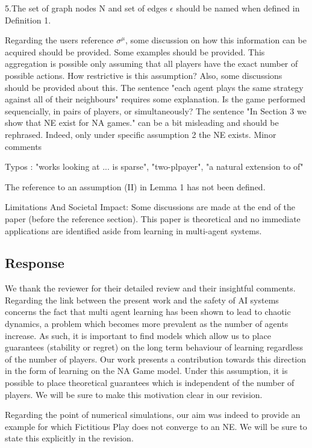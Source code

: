 \documentclass{article}
\begin{document}
	5.The set of graph nodes N and set of edges $\epsilon$ should be named when defined in Definition 1.
	
	Regarding the users reference $\sigma^{\mu}$, some discussion on how this information can be acquired should be provided. Some examples should be provided. This aggregation is possible only assuming that all players have the exact number of possible actions. How restrictive is this assumption? Also, some discussions should be provided about this.
	The sentence "each agent plays the same strategy against all of their neighbours" requires some explanation. Is the game performed sequencially, in pairs of players, or simultaneously?
	The sentence "In Section 3 we show that NE exist for NA games." can be a bit misleading and should be rephrased. Indeed, only under specific assumption 2 the NE exists.
	Minor comments
	
	Typos : "works looking at ... is sparse", "two-plpayer", "a natural extension to of"
	
	The reference to an assumption (II) in Lemma 1 has not been defined.
	
	Limitations And Societal Impact:
	Some discussions are made at the end of the paper (before the reference section). This paper is theoretical and no immediate applications are identified aside from learning in multi-agent systems.
	
	
	\subsection{Response}
	
	We thank the reviewer for their detailed review and their insightful comments. Regarding the link between the present work and the safety of AI systems concerns the fact that multi agent learning has been shown to lead to chaotic dynamics, a problem which becomes more prevalent as the number of agents increase. As such, it is important to find models which allow us to place guarantees (stability or regret) on the long term behaviour of learning regardless of the number of players. Our work presents a contribution towards this direction in the form of learning on the NA Game model. Under this assumption, it is possible to place theoretical guarantees which is independent of the number of players. We will be sure to make this motivation clear in our revision.
	
	Regarding the point of numerical simulations, our aim was indeed to provide an example for which Fictitious Play does not converge to an NE. We will be sure to state this explicitly in the revision.
	
\end{document}
